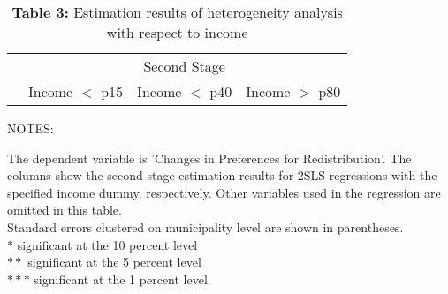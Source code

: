\documentclass[12pt,a4paper]{standalone}
\newcommand\tab[1][1cm]{\hspace*{#1}}
\newcommand\tabs[1][0.8cm]{\hspace*{#1}}
\newcommand\tabu[1][0.4cm]{\hspace*{#1}}
\begin{document}
\begin{minipage}[c][11cm]{1.2 \textwidth}

\thispagestyle{empty}

\begin{table}
\centering
\caption*{\textbf{Table 3:} Estimation results of heterogeneity analysis with respect to income}

\begin{threeparttable}
\begin{tabular}{lccc}

    \toprule
    & \multicolumn{3}{c}{Second Stage} \\ 
    \cmidrule(lr){2-4}
    & Income $<$ p15 & Income $<$ p40 & Income $>$ p80 \\

    \midrule
 

    \bottomrule
\end{tabular}

    \begin{tablenotes}
    \item NOTES:
	\par
	\begingroup
	\leftskip=0.3cm %
	\noindent 
	The dependent variable is 'Changes in Preferences for 		Redistribution'. The columns show the second stage 			estimation results for 2SLS regressions with the 			specified income dummy, respectively. Other variables 		used in the regression are omitted in this table.\\
    Standard errors clustered on municipality level are 		shown in parentheses. \\
    $ \ast $ \tab significant at the 10 percent level \\
    $ \ast \ast $ \tabs significant at the 5 percent level 	\\
    $ \ast \ast \ast $ \tabu significant at the 1 percent 		level.
	\par
	\endgroup




    \end{tablenotes}
\end{threeparttable}
\end{table}

\end{minipage}
\end{document}
